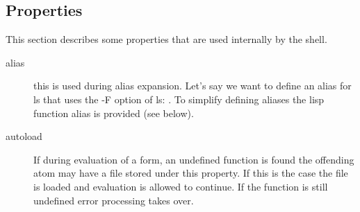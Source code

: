 \subsection{Properties}
This section describes some properties that are used internally by the
shell.

\begin{description}
\item[alias] this is used during alias expansion.  Let's say we want
  to define an alias for ls that uses the -F option of ls: .  To simplify defining aliases the lisp function
  alias is provided (see below).
\item[autoload] If during evaluation of a form, an undefined function
  is found the offending atom may have a file stored under this
  property. If this is the case the file is loaded and evaluation is
  allowed to continue.  If the function is still undefined error
  processing takes over.
\end{description}
